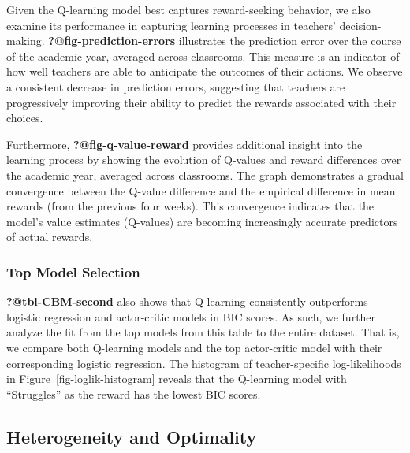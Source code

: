 \documentclass[
  number,
  preprint,
  3p,
  onecolumn]{elsarticle}
\begin{document}
Given the Q-learning model best captures reward-seeking behavior, we
also examine its performance in capturing learning processes in
teachers' decision-making. \textbf{?@fig-prediction-errors} illustrates
the prediction error over the course of the academic year, averaged
across classrooms. This measure is an indicator of how well teachers are
able to anticipate the outcomes of their actions. We observe a
consistent decrease in prediction errors, suggesting that teachers are
progressively improving their ability to predict the rewards associated
with their choices.

Furthermore, \textbf{?@fig-q-value-reward} provides additional insight
into the learning process by showing the evolution of Q-values and
reward differences over the academic year, averaged across classrooms.
The graph demonstrates a gradual convergence between the Q-value
difference and the empirical difference in mean rewards (from the
previous four weeks). This convergence indicates that the model's value
estimates (Q-values) are becoming increasingly accurate predictors of
actual rewards.

\subsubsection{Top Model Selection}\label{top-model-selection}

\textbf{?@tbl-CBM-second} also shows that Q-learning consistently
outperforms logistic regression and actor-critic models in BIC scores.
As such, we further analyze the fit from the top models from this table
to the entire dataset. That is, we compare both Q-learning models and
the top actor-critic model with their corresponding logistic regression.
The histogram of teacher-specific log-likelihoods in
Figure~\ref{fig-loglik-histogram} reveals that the Q-learning model with
``Struggles'' as the reward has the lowest BIC scores.

\subsection{Heterogeneity and
Optimality}\label{heterogeneity-and-optimality}
\end{document}
